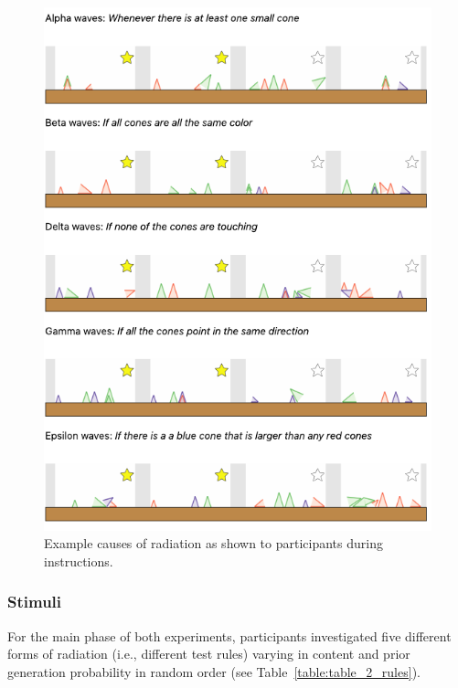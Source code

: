 \documentclass[doc,natbib,floatsintext]{apa7}
\begin{document}
\begin{figure}[!th]
    \begin{center}
      \includegraphics[width=0.4\columnwidth]{img/fig_4_test_rules.pdf}
    \end{center}

    \caption{Example causes of radiation as shown to participants during instructions.}
    \label{fig:fig_4_test_rules}
\end{figure}


\subsubsection{Stimuli}
For the main phase of both experiments, participants investigated five different forms of radiation (i.e., different test rules) varying in content and prior generation probability in random order (see Table~\ref{table:table_2_rules}).
\end{document}
